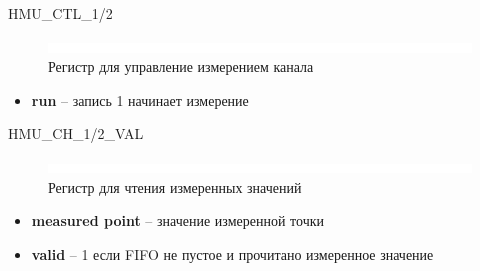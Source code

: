 \begin{register}{H}{MU\_CTL\_1/2}{}%
\label{example}%
%
%
 \regnewline%
\end{register}

\begin{figure}[ht!] 
	\center
	\includegraphics  {my_folder/images//blank}
	\caption{Регистр для управление измерением канала} 
	\label{fig:mu-ctl-reg}  
\end{figure}
\FloatBarrier
\begin{itemize}[label={}]
	\item \textbf{run} -- запись 1 начинает измерение\\
\end{itemize}


\begin{register}{H}{MU\_CH\_1/2\_VAL}{}%
\label{example}%
%
%
%
 \regnewline%
\end{register}

\begin{figure}[ht!] 
	\center
	\includegraphics  {my_folder/images//blank}
	\caption{Регистр для чтения измеренных значений} 
	\label{fig:mu-p-reg}  
\end{figure}
\FloatBarrier
\begin{itemize}[label={}]
	\item \textbf{measured point} -- значение измеренной точки
	\item \textbf{valid} -- 1 если FIFO не пустое и прочитано измеренное значение\\
\end{itemize}

\FloatBarrier




\newpage